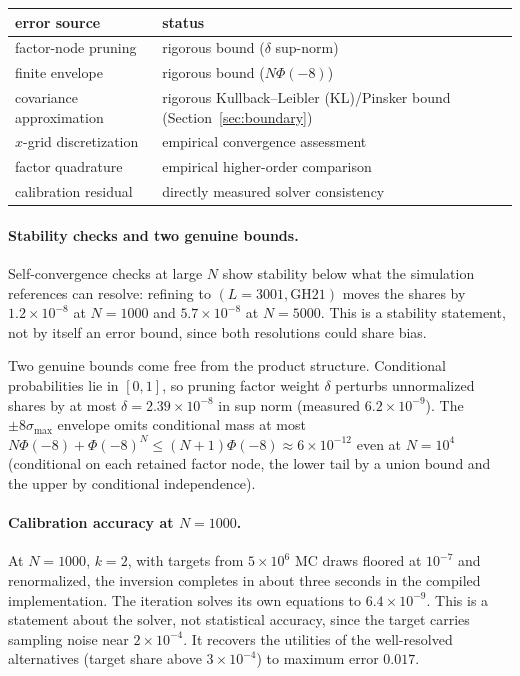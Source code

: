 \documentclass[12pt]{article}
\theoremstyle{remark}
\begin{document}
\begin{center}
\footnotesize
\begin{tabular}{lp{6.2cm}}
\toprule
error source & status \\
\midrule
factor-node pruning & rigorous bound ($\delta$ sup-norm) \\
finite envelope & rigorous bound ($N\Phi(-8)$) \\
covariance approximation & rigorous Kullback--Leibler (KL)/Pinsker bound (Section~\ref{sec:boundary}) \\
$x$-grid discretization & empirical convergence assessment \\
factor quadrature & empirical higher-order comparison \\
calibration residual & directly measured solver consistency \\
\bottomrule
\end{tabular}
\end{center}

\paragraph{Stability checks and two genuine bounds.} Self-convergence
checks at large $N$ show stability below what the
simulation references can resolve: refining to $(L = 3001, \mathrm{GH}21)$
moves the shares by $1.2\times10^{-8}$ at $N=1000$ and
$5.7\times10^{-8}$ at $N=5000$. This is a stability statement, not by
itself an error bound, since both resolutions could share bias.

Two genuine bounds
come free from the product structure. Conditional probabilities lie in
$[0,1]$, so pruning factor weight $\delta$ perturbs unnormalized shares by
at most $\delta = 2.39\times10^{-8}$ in sup norm (measured
$6.2\times10^{-9}$). The $\pm8\sigma_{\max}$ envelope omits
conditional mass at most $N\Phi(-8) + \Phi(-8)^N \le (N+1)\Phi(-8)
\approx 6\times10^{-12}$ even at $N = 10^4$ (conditional on each retained factor node, the lower tail by a union
bound and the upper by conditional independence).

\paragraph{Calibration accuracy at $N=1000$.}

At $N=1000$, $k=2$, with targets from
$5\times10^6$ MC draws floored at $10^{-7}$ and renormalized, the inversion
completes in about three seconds in the compiled implementation. The
iteration solves its own equations
to $6.4\times10^{-9}$. This is a statement about the solver, not
statistical accuracy, since the target carries sampling noise near
$2\times10^{-4}$. It recovers the utilities
of the well-resolved alternatives (target share above $3\times10^{-4}$)
to maximum error $0.017$.
\end{document}

